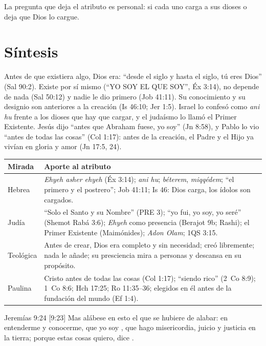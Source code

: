 La pregunta que deja el atributo es personal: si cada uno carga a sus dioses o deja que Dios lo cargue.

\section{Síntesis}

\begin{tcolorbox}[colback=papiro,colframe=azul,boxrule=1pt,arc=3pt]
Antes de que existiera algo, Dios era: ``desde el siglo y hasta el siglo, tú eres Dios'' (Sal 90:2). Existe por sí mismo (``YO SOY EL QUE SOY'', Éx 3:14), no depende de nada (Sal 50:12) y nadie le dio primero (Job 41:11). Su conocimiento y su designio son anteriores a la creación (Is 46:10; Jer 1:5). Israel lo confesó como \emph{ani hu} frente a los dioses que hay que cargar, y el judaísmo lo llamó el Primer Existente. Jesús dijo ``antes que Abraham fuese, yo soy'' (Jn 8:58), y Pablo lo vio ``antes de todas las cosas'' (Col 1:17): antes de la creación, el Padre y el Hijo ya vivían en gloria y amor (Jn 17:5, 24).
\end{tcolorbox}

\begin{center}\small\renewcommand{\arraystretch}{1.3}
\begin{tabular}{@{}L{3.0cm}L{11.4cm}@{}}
\toprule
\textbf{Mirada} & \textbf{Aporte al atributo} \\ \midrule
Hebrea & \emph{Ehyeh asher ehyeh} (Éx 3:14); \emph{ani hu}; \emph{béterem}, \emph{miqqédem}; ``el primero y el postrero''; Job 41:11; Is 46: Dios carga, los ídolos son cargados. \\
Judía & ``Solo el Santo y su Nombre'' (PRE 3); ``yo fui, yo soy, yo seré'' (Shemot Rabá 3:6); \emph{Ehyeh} como presencia (Berajot 9b; Rashi); el Primer Existente (Maimónides); \emph{Adon Olam}; 1QS 3:15. \\
Teológica & Antes de crear, Dios era completo y sin necesidad; creó libremente; nada le añade; su presciencia mira a personas y descansa en su propósito. \\
Paulina & Cristo antes de todas las cosas (Col 1:17); ``siendo rico'' (2~Co 8:9); 1~Co 8:6; Hch 17:25; Ro 11:35--36; elegidos en él antes de la fundación del mundo (Ef 1:4). \\
\bottomrule
\end{tabular}\end{center}

\begin{verso}{Jeremías 9:24 [9:23]}
Mas alábese en esto el que se hubiere de alabar: en entenderme y conocerme, que yo soy \SENOR{}, que hago misericordia, juicio y justicia en la tierra; porque estas cosas quiero, dice \SENOR{}.
\end{verso}

